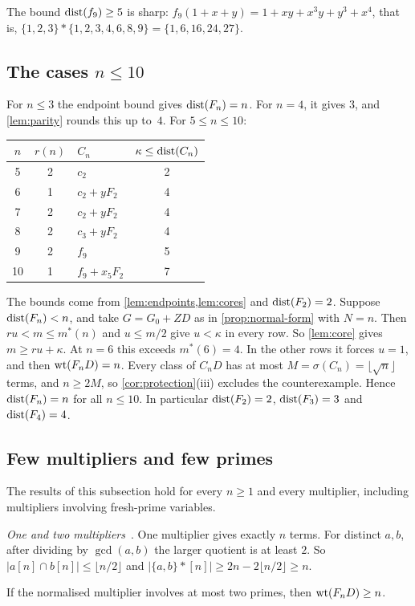 The bound $\operatorname{dist}(f_9)\ge5$ is sharp: $f_9(1+x+y)=1+xy+x^3y+y^3+x^4$, that is, $\{1,2,3\}*\{1,2,3,4,6,8,9\}=\{1,6,16,24,27\}$.

\subsection{The cases \texorpdfstring{$n\le10$}{n <= 10}}
For $n\le3$ the endpoint bound gives $\operatorname{dist}(F_n)=n$. For $n=4$, it gives $3$, and \cref{lem:parity} rounds this up to~$4$. For $5\le n\le10$:

\smallskip
\begin{center}\small
\begin{tabular}{c|c|l|c}
$n$&$r(n)$&$C_n$&$\kappa\le\operatorname{dist}(C_n)$\\\hline
5&2&$c_2$&2\\
6&1&$c_2+yF_2$&4\\
7&2&$c_2+yF_2$&4\\
8&2&$c_3+yF_2$&4\\
9&2&$f_9$&5\\
10&1&$f_9+x_5F_2$&7
\end{tabular}
\end{center}
\smallskip

The bounds come from \cref{lem:endpoints,lem:cores} and $\operatorname{dist}(F_2)=2$. Suppose $\operatorname{dist}(F_n)<n$, and take $G=G_0+ZD$ as in \cref{prop:normal-form} with $N=n$. Then $ru<m\le m^*(n)$ and $u\le m/2$ give $u<\kappa$ in every row. So \cref{lem:core} gives $m\ge ru+\kappa$. At $n=6$ this exceeds $m^*(6)=4$. In the other rows it forces $u=1$, and then $\operatorname{wt}(F_nD)=n$. Every class of $C_nD$ has at most $M=\sigma(C_n)=\lfloor\sqrt n\rfloor$ terms, and $n\ge2M$, so \cref{cor:protection}(iii) excludes the counterexample. Hence $\operatorname{dist}(F_n)=n$ for all $n\le10$. In particular $\operatorname{dist}(F_2)=2$, $\operatorname{dist}(F_3)=3$ and $\operatorname{dist}(F_4)=4$.

\subsection{Few multipliers and few primes}
The results of this subsection hold for every $n\ge1$ and every multiplier, including multipliers involving fresh-prime variables.

\emph{One and two multipliers}~\cite{KM}. One multiplier gives exactly $n$ terms. For distinct $a,b$, after dividing by $\gcd(a,b)$ the larger quotient is at least $2$. So $|a[n]\cap b[n]|\le\lfloor n/2\rfloor$ and $|\{a,b\}*[n]|\ge2n-2\lfloor n/2\rfloor\ge n$.

\begin{lemma}\label{lem:two-primes}
If the normalised multiplier involves at most two primes, then $\operatorname{wt}(F_nD)\ge n$.
\end{lemma}

